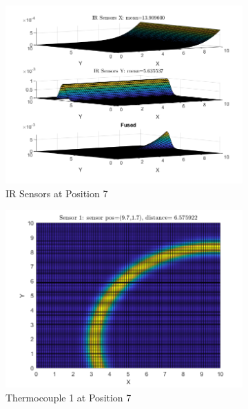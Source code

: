 \documentclass[12pt]{article}
\begin{document}
\begin{figure}[H]
    \centering
    \begin{subfigure}[h]{0.8\textwidth}
        \includegraphics[width=\textwidth]{images/P7.png}
        \caption{IR Sensors at Position 7}
        \label{fig:P7IR}
    \end{subfigure}
    \baselineskip
    \begin{subfigure}[h]{0.4\textwidth}
        \includegraphics[width=\textwidth]{images/P7S1.png}
        \caption{Thermocouple 1 at Position 7}
        \label{fig:P7S1}
    \end{subfigure}
    \begin{subfigure}[h]{0.4\textwidth}

\end{subfigure}
\end{figure}
\end{document}
